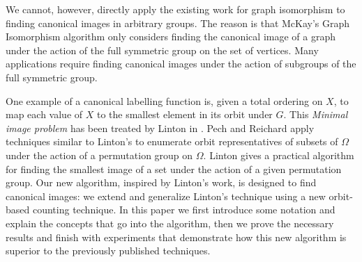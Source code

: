 We cannot, however, directly apply the existing work for graph isomorphism to
finding canonical images in arbitrary groups. The reason is that McKay's Graph Isomorphism algorithm only considers finding the canonical image of a graph
under the action of the full symmetric group on the set of vertices. Many
applications require finding canonical images under the action of subgroups of
the full symmetric group.

One example of a canonical labelling function is, given a total ordering on \(X\), to
map each value of \(X\) to the smallest element in its orbit under \(G\). This
\emph{Minimal image problem} has been treated by Linton in
\cite{Linton:SmallestImage}. Pech and Reichard \cite{Pech2009} apply techniques
similar to Linton's to enumerate orbit representatives of subsets of $\Omega$
under the action of a permutation group on $\Omega$.
Linton gives a practical algorithm for finding the smallest image of a set under
the action of a given permutation group. Our new algorithm, inspired by Linton's
work, is designed to find canonical images: we extend and generalize Linton's
technique using a new orbit-based counting technique. In this paper we first
introduce some notation and explain the concepts that go into the algorithm,
then we prove the necessary results and finish with experiments that demonstrate
how this new algorithm is superior to the previously published techniques. 